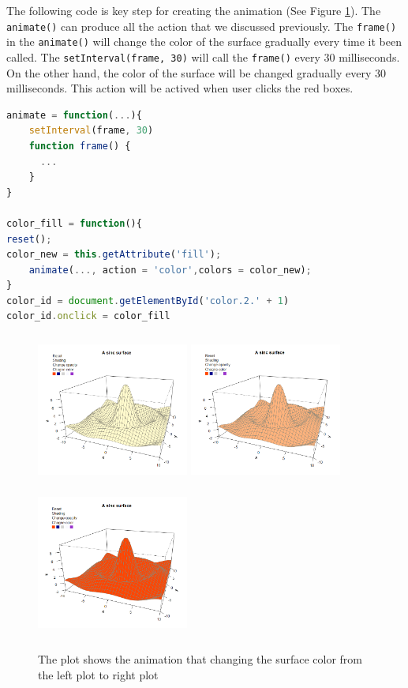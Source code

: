 \documentclass[paper=a4, fontsize=11pt]{report}
\begin{document}
The following code is key step for creating the animation (See Figure \ref{Example_6.3.1}). The \texttt{animate()} can produce all the action that we discussed previously. The \texttt{frame()} in the \texttt{animate()} will change the color of the surface gradually every time it been called. The \texttt{setInterval(frame, 30)} will call the \texttt{frame()} every 30 milliseconds. On the other hand, the color of the surface will be changed gradually every 30 milliseconds. This action will be actived when user clicks the red boxes.

\begin{lstlisting}[language = JavaScript]
animate = function(...){
    setInterval(frame, 30)
    function frame() {
      ...
    }
}

color_fill = function(){
reset();
color_new = this.getAttribute('fill');
    animate(..., action = 'color',colors = color_new);
}
color_id = document.getElementById('color.2.' + 1)
color_id.onclick = color_fill
\end{lstlisting}


\begin{figure}[h]
	\begin{center}
		\includegraphics[height = 5cm, width = 5cm]{figure/svg/origin_1.PNG}
		\includegraphics[height = 5cm, width = 5cm]{figure/svg/change_2.PNG}
		\includegraphics[height = 5cm, width = 5cm]{figure/svg/change_3.PNG}
		\caption{The plot shows the animation that changing the surface color from the left plot to right plot}
		\label{Example_6.3.1}
	\end{center}
\end{figure}
\end{document}
